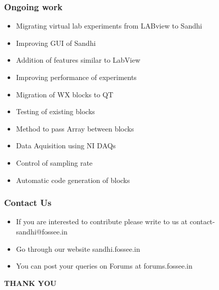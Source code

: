 \documentclass{beamer}
\begin{document}
\begin{frame}
\frametitle{Ongoing work}
\begin{itemize}
\item Migrating virtual lab experiments from LABview to Sandhi
\item Improving GUI of Sandhi
\item Addition of features similar to LabView
\item Improving performance of experiments
\item Migration of WX blocks to QT
\item Testing of existing blocks
\item Method to pass Array between blocks
\item Data Aquisition using NI DAQs
\item Control of sampling rate
\item Automatic code generation of blocks
\end{itemize}
\end{frame}

\begin{frame}
\frametitle{Contact Us}
\begin{itemize}
 \item If you are interested to contribute please write to us at {\color{blue} contact-sandhi@fossee.in }
 \item Go through our website {\color{blue} sandhi.fossee.in }
 \item You can post your queries on Forums at {\color{blue} forums.fossee.in }
\end{itemize}
\end{frame}

\begin{frame}
\begin{center}
    \large {\textbf{THANK YOU}}
\end{center}
\end{frame}
\end{document}
